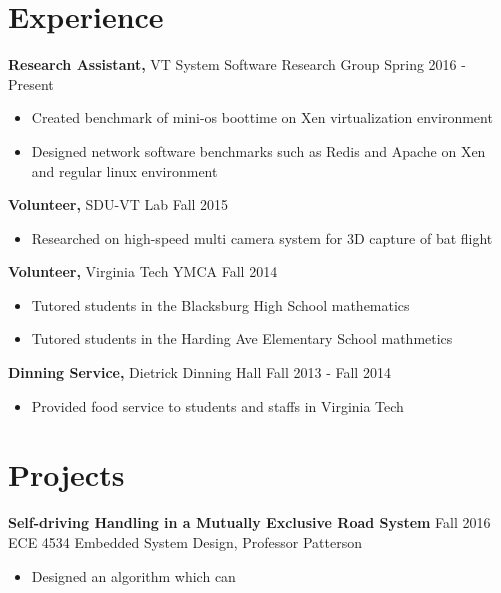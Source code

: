 \documentclass[margin]{res}
\begin{document}
\begin{resume}
  
\section{Experience} %

 {\bf Research Assistant,} VT System Software Research Group \hfill Spring 2016 - Present
 \begin{itemize} \itemsep -2pt  %
 \item Created benchmark of mini-os boottime on Xen virtualization environment
 \item Designed network software benchmarks such as Redis and Apache on Xen and 
 	regular linux environment
 \end{itemize}

{\bf Volunteer,} SDU-VT Lab \hfill  Fall 2015
\begin{itemize} \itemsep -2pt %
\item Researched on high-speed multi camera system for 3D capture of bat flight
\end{itemize}

{\bf Volunteer,} Virginia Tech YMCA  \hfill
Fall 2014                
                \begin{itemize} \itemsep -2pt
                 \item  Tutored students in the Blacksburg High School mathematics
                
                 \item Tutored students in the Harding Ave Elementary School mathmetics

		 \end{itemize}
		 
{\bf Dinning Service,} Dietrick Dinning Hall \hfill  Fall 2013 - Fall 2014
\begin{itemize} \itemsep -2pt %
\item Provided food service to students and staffs in Virginia Tech
\end{itemize}


\section{Projects} 
               {\bf Self-driving Handling in a Mutually Exclusive Road System}     \hfill         Fall 2016  \\           
                {ECE 4534 Embedded System Design, Professor Patterson} 
                 \begin{itemize} \itemsep -2pt
                 \item Designed an algorithm which can 
                 

\end{itemize}
\end{resume}
\end{document}
